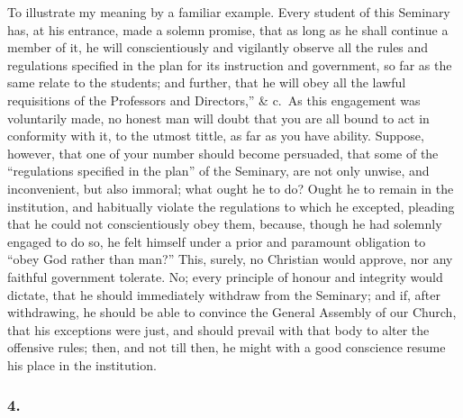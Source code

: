 \documentclass[
]{book}
\begin{document}
To illustrate my meaning by a familiar example. Every student of this Seminary has, at his entrance, made a solemn promise, that as long as he shall continue a member of it, he will conscientiously and vigilantly observe all the rules and regulations specified in the plan for its instruction and government, so far as the same relate to the students; and further, that he will obey all the lawful requisitions of the Professors and Directors,'' \& c.~As this engagement was voluntarily made, no honest man will doubt that you are all bound to act in conformity with it, to the utmost tittle, as far as you have ability. Suppose, however, that one of your number should become persuaded, that some of the ``regulations specified in the plan'' of the Seminary, are not only unwise, and inconvenient, but also immoral; what ought he to do? Ought he to remain in the institution, and habitually violate the regulations to which he excepted, pleading that he could not conscientiously obey them, because, though he had solemnly engaged to do so, he felt himself under a prior and paramount obligation to ``obey God rather than man?'' This, surely, no Christian would approve, nor any faithful government tolerate. No; every principle of honour and integrity would dictate, that he should immediately withdraw from the Seminary; and if, after withdrawing, he should be able to convince the General Assembly of our Church, that his exceptions were just, and should prevail with that body to alter the offensive rules; then, and not till then, he might with a good conscience resume his place in the institution.

\hypertarget{section-15}{%
\subsubsection*{4.}\label{section-15}}
\end{document}
